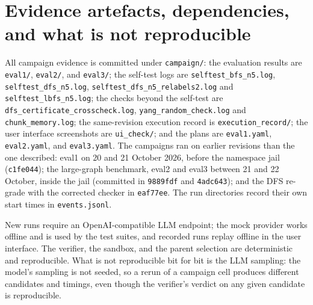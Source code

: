 \section{Evidence artefacts, dependencies, and what is not reproducible}

All campaign evidence is committed under \texttt{campaign/}: the evaluation
results are \texttt{eval1/}, \texttt{eval2/}, and \texttt{eval3/}; the self-test
logs are \texttt{selftest\_bfs\_n5.log}, \texttt{selftest\_dfs\_n5.log},
\texttt{selftest\_dfs\_n5\_relabels2.log} and \texttt{selftest\_lbfs\_n5.log};
the checks beyond the self-test are \texttt{dfs\_certificate\_crosscheck.log},
\texttt{yang\_random\_check.log} and \texttt{chunk\_memory.log}; the
same-revision execution record is \texttt{execution\_record/}; the
user interface screenshots are \texttt{ui\_check/}; and the plans are
\texttt{eval1.yaml}, \texttt{eval2.yaml}, and \texttt{eval3.yaml}. The campaigns
ran on earlier revisions than the one described: eval1 on 20 and 21 October 2026,
before the namespace jail (\texttt{c1fe044}); the large-graph benchmark, eval2
and eval3 between 21 and 22 October, inside the jail (committed in
\texttt{9889fdf} and \texttt{4adc643}); and the DFS re-grade with the corrected
checker in \texttt{eaf77ee}. The run directories record their own start times in
\texttt{events.jsonl}.

New runs require an OpenAI-compatible LLM endpoint; the mock provider works
offline and is used by the test suites, and recorded runs replay offline in the
user interface. The verifier, the sandbox, and the parent selection are
deterministic and reproducible. What is not reproducible bit for bit is the LLM
sampling: the model's sampling is not seeded, so a rerun of a campaign cell
produces different candidates and timings, even though the verifier's verdict on
any given candidate is reproducible.
